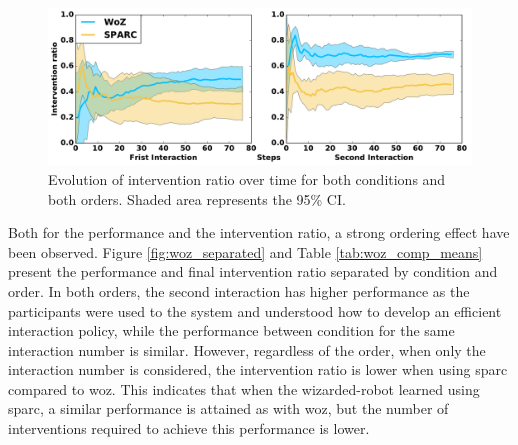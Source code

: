 \begin{figure}[ht]
	\centering
	\includegraphics[width=1.\textwidth]{ratio_time.pdf}
	\caption{Evolution of intervention ratio over time for both conditions and both orders. Shaded area represents the 95\% CI.}
	\label{fig:woz_ratio_time}
\end{figure}

Both for the performance and the intervention ratio, a strong ordering effect have been observed. Figure \ref{fig:woz_separated} and Table \ref{tab:woz_comp_means} present the performance and final intervention ratio separated by condition and order. In both orders, the second interaction has higher performance as the participants were used to the system and understood how to develop an efficient interaction policy, while the performance between condition for the same interaction number is similar. However, regardless of the order, when only the interaction number is considered, the intervention ratio is lower when using \gls{sparc} compared to \gls{woz}. This indicates that when the wizarded-robot learned using \gls{sparc}, a similar performance is attained as with \gls{woz}, but the number of interventions required to achieve this performance is lower.


